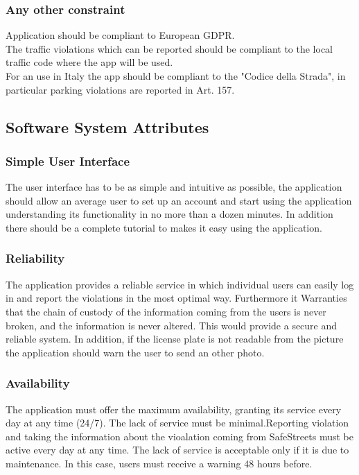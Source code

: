 \subsubsection{Any other constraint}
Application should be compliant to European GDPR.\\
The traffic violations which can be reported should be compliant to the local traffic code where the app will be used.\\
For an use in Italy the app should be compliant to the "Codice della Strada", in particular parking violations are reported in Art. 157.\\

\subsection{Software System Attributes}
\subsubsection{Simple User Interface}
The user interface has to be as simple and intuitive as possible, the application should allow an average user to set up an account and start using the application understanding its functionality in no more than a dozen minutes. In addition there should be a complete tutorial to makes it easy using the application.

\subsubsection{Reliability}
The application provides a reliable service in which individual users can easily log in and report the violations in the most optimal way. Furthermore it Warranties that the chain of custody of the information coming from the users is never broken, and the information is never altered. This would provide a secure and reliable system. In addition, if the license plate	is not readable from the picture the application should warn the user to send an other photo.
\subsubsection{Availability}
The application must offer the maximum availability, granting its service every day at any time (24/7). The lack of service must be minimal.Reporting violation and taking the information about the vioalation coming from SafeStreets must be active every day at any time. The lack of service is acceptable only if it is due to maintenance. In this case, users must receive a warning 48 hours before.
